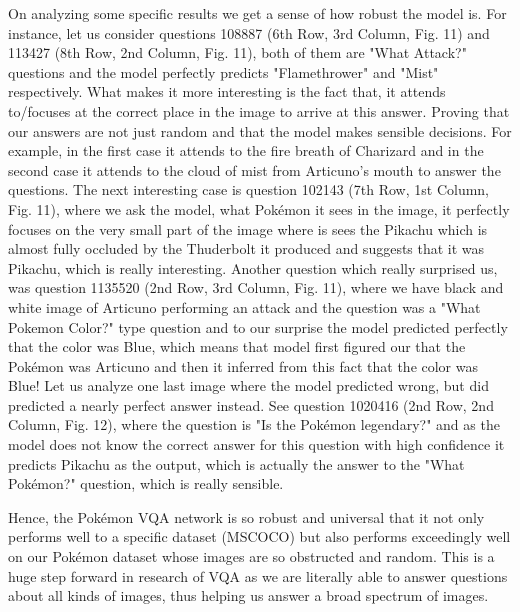\documentclass[journal, a4paper]{IEEEtran}
\begin{document}
	On analyzing some specific results we get a sense of how robust the model is. For instance, let us consider questions 108887 (6th Row, 3rd Column, Fig. 11) and 113427 (8th Row, 2nd Column, Fig. 11), both of them are "What Attack?" questions and the model perfectly predicts "Flamethrower" and "Mist" respectively. What makes it more interesting is the fact that, it attends to/focuses at the correct place in the image to arrive at this answer. Proving that our answers are not just random and that the model makes sensible decisions. For example, in the first case it attends to the fire breath of Charizard and in the second case it attends to the cloud of mist from Articuno's mouth to answer the questions. The next interesting case is question 102143 (7th Row, 1st Column, Fig. 11), where we ask the model, what Pok\'emon it sees in the image, it perfectly focuses on the very small part of the image where is sees the Pikachu which is almost fully occluded by the Thuderbolt it produced and suggests that it was Pikachu, which is really interesting. Another question which really surprised us, was question 1135520 (2nd Row, 3rd Column, Fig. 11), where we have black and white image of Articuno performing an attack and the question was a "What Pokemon Color?" type question and to our surprise the model predicted perfectly that the color was Blue, which means that model first figured our that the Pok\'emon was Articuno and then it inferred from this fact that the color was Blue! Let us analyze one last image where the model predicted wrong, but did predicted a nearly perfect answer instead. See question 1020416 (2nd Row, 2nd Column, Fig. 12), where the question is "Is the Pok\'emon legendary?" and as the model does not know the correct answer for this question with high confidence it predicts Pikachu as the output, which is actually the answer to the "What Pok\'emon?" question, which is really sensible.
	
	Hence, the Pok\'emon VQA network is so robust and universal that it not only performs well to a specific dataset (MSCOCO) but also performs exceedingly well on our Pok\'emon dataset whose images are so obstructed and random. This is a huge step forward in research of VQA as we are literally able to answer questions about all kinds of images, thus helping us answer a broad spectrum of images. 
\end{document}
